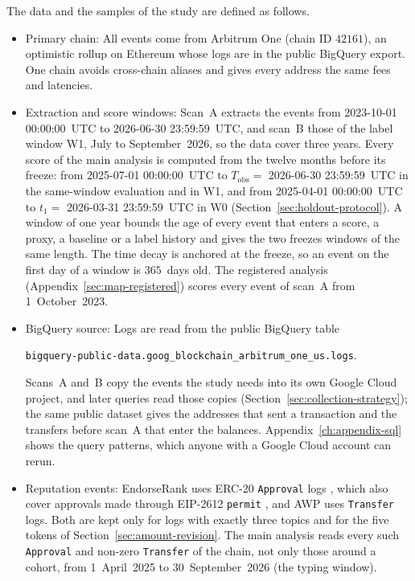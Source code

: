 The data and the samples of the study are defined as follows.
\begin{itemize}
\item Primary chain: All events come from Arbitrum One (chain ID $42161$), an optimistic rollup on Ethereum \parencite{thibault2022rollups} whose logs are in the public BigQuery export. One chain avoids cross-chain aliases and gives every address the same fees and latencies.

\item Extraction and score windows: Scan~A extracts the events from 2023-10-01 00:00:00~UTC to 2026-06-30 23:59:59~UTC, and scan~B those of the label window W1, July to September~2026, so the data cover three years. Every score of the main analysis is computed from the twelve months before its freeze: from 2025-07-01 00:00:00~UTC to $T_{\mathrm{obs}}=$ 2026-06-30 23:59:59~UTC in the same-window evaluation and in W1, and from 2025-04-01 00:00:00~UTC to $t_1=$ 2026-03-31 23:59:59~UTC in W0 (Section~\ref{sec:holdout-protocol}). A window of one year bounds the age of every event that enters a score, a proxy, a baseline or a label history and gives the two freezes windows of the same length. The time decay is anchored at the freeze, so an event on the first day of a window is $365$~days old. The registered analysis (Appendix~\ref{sec:map-registered}) scores every event of scan~A from 1~October~2023.

\item BigQuery source: Logs are read from the public BigQuery table
\begin{center}
\texttt{bigquery-public-data.goog\_blockchain\_arbitrum\_one\_us.logs}.
\end{center}
Scans~A and~B copy the events the study needs into its own Google Cloud project, and later queries read those copies (Section~\ref{sec:collection-strategy}); the same public dataset gives the addresses that sent a transaction and the transfers before scan~A that enter the balances. Appendix~\ref{ch:appendix-sql} shows the query patterns, which anyone with a Google Cloud account can rerun.

\item Reputation events: EndorseRank uses ERC-20 \texttt{Approval} logs \parencite{vogelsteller2015erc20}, which also cover approvals made through EIP-2612 \texttt{permit} \parencite{lundfall2020permit}, and AWP uses \texttt{Transfer} logs. Both are kept only for logs with exactly three topics and for the five tokens of Section~\ref{sec:amount-revision}. The main analysis reads every such \texttt{Approval} and non-zero \texttt{Transfer} of the chain, not only those around a cohort, from 1~April~2025 to 30~September~2026 (the typing window).


\end{itemize}
